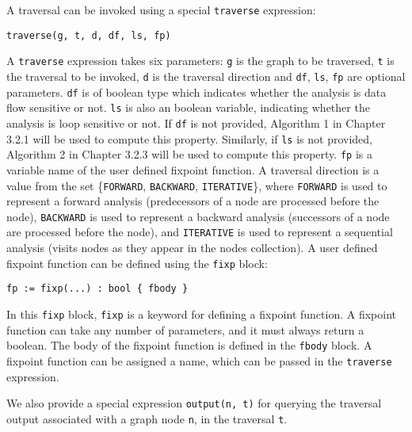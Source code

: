 A traversal can be invoked using a special \lstinline|traverse| expression:
\begin{lstlisting}
traverse(g, t, d, df, ls, fp)
\end{lstlisting}

A \lstinline|traverse| expression takes six parameters: \lstinline|g| is the
graph to be traversed, \lstinline|t| is the traversal to be invoked,
\lstinline|d| is the traversal direction and \lstinline|df|, \lstinline|ls|, \lstinline|fp| are optional
parameters. \lstinline|df| is of boolean type which indicates whether the analysis is data flow sensitive or not. \lstinline|ls| is also an boolean variable, indicating whether the analysis is loop sensitive or not. If \lstinline|df| is not provided, Algorithm 1 in Chapter 3.2.1 will be used to compute this property. Similarly, if \lstinline|ls| is not provided, Algorithm 2 in Chapter 3.2.3 will be used to compute this property. \lstinline|fp| is a variable name of the user defined fixpoint function. A
traversal direction is a value from the set \{\lstinline|FORWARD|,
\lstinline|BACKWARD|, \lstinline|ITERATIVE|\}, where \lstinline|FORWARD| is used
to represent a forward analysis (predecessors of a node are processed before the
node), \lstinline|BACKWARD| is used to represent a backward analysis (successors
of a node are processed before the node), and \lstinline|ITERATIVE| is used to
represent a sequential analysis (visits nodes as they appear in the nodes
collection).
A user defined fixpoint function can be defined using the \lstinline|fixp|
block:
\begin{lstlisting}
fp := fixp(...) : bool { fbody }
\end{lstlisting}

In this \lstinline|fixp| block, \lstinline|fixp| is a keyword for defining a
fixpoint function. A fixpoint function can take any number of parameters, and it
must always return a boolean. The body of the fixpoint function is defined in
the \lstinline|fbody| block. A fixpoint function can be assigned a name, which
can be passed in the \lstinline|traverse| expression.

We also provide a special expression \lstinline|output(n, t)| for querying the
traversal output associated with a graph node \lstinline|n|, in the traversal
\lstinline|t|.

